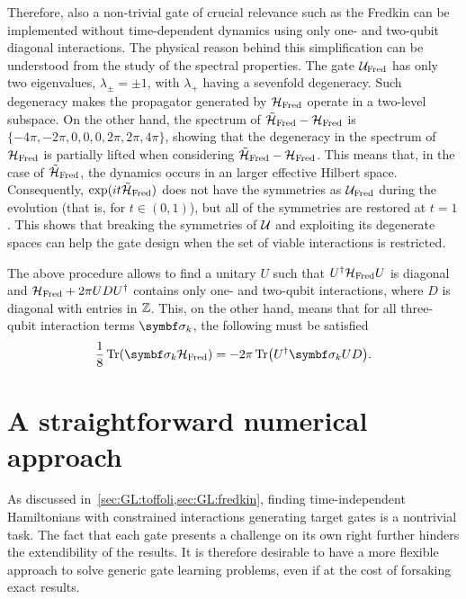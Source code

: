 Therefore, also a non-trivial gate of crucial relevance such as the Fredkin can be implemented without time-dependent dynamics using only one- and two-qubit diagonal interactions.
The physical reason behind this simplification can be understood from the study of the spectral properties.
The gate ${\mathcal{U}}_{\operatorname{Fred}}$ has only two eigenvalues, $\lambda_\pm=\pm1$,
with $\lambda_+$ having a sevenfold degeneracy. Such degeneracy makes the propagator generated by ${\mathcal{H}}_{\operatorname{Fred}}$ operate in a two-level subspace.
On the other hand, the spectrum of $\tilde{{\mathcal{H}}}_{\operatorname{Fred}}-{\mathcal{H}}_{\operatorname{Fred}}$ is $\{{-}4\pi,{-}2\pi,0,0,0,2\pi,2\pi,4\pi\}$, showing that the degeneracy in the spectrum of ${\mathcal{H}}_{\operatorname{Fred}}$ is partially lifted when considering $\tilde{{\mathcal{H}}}_{\operatorname{Fred}}-{\mathcal{H}}_{\operatorname{Fred}}$.
This means that, in the case of $\tilde{{\mathcal{H}}}_{\operatorname{Fred}}$, the dynamics occurs in an larger effective Hilbert space.  %
Consequently, $\exponential(it\HTildeFred)$ does not have the symmetries as ${\mathcal{U}}_{\operatorname{Fred}}$ during the evolution (that is, for $t\in(0,1)$), but all of the symmetries are restored at $t=1$. This  shows that breaking the symmetries of ${\mathcal{U}}$ and exploiting its degenerate spaces can help the gate design when the set of viable interactions is restricted.

The above procedure allows to find a unitary $U$ such that
$U^\dagger{\mathcal{H}}_{\operatorname{Fred}} U$ is diagonal and
${\mathcal{H}}_{\operatorname{Fred}} + 2\pi U D U^\dagger$ contains only one- and two-qubit interactions, where $D$ is diagonal with entries in ${\mathbb{Z}}$.
This, on the other hand, means that for all three-qubit interaction terms $\bs\sigma_k$, the following must be satisfied
\begin{equation}
    \frac18\Tr(\bs\sigma_k\HFred) = -2\pi \Tr(U^\dagger\bs\sigma_k U D).
\end{equation}



\section{A straightforward numerical approach}
\label{sec:GL:numerical_approach}

As discussed in~\cref{sec:GL:toffoli,sec:GL:fredkin}, finding time-independent Hamiltonians with constrained interactions generating target gates is a nontrivial task. 
The fact that each gate presents a challenge on its own right further hinders the extendibility of the results.
It is therefore desirable to have a more flexible approach to solve generic gate learning problems, even if at the cost of forsaking exact results.

